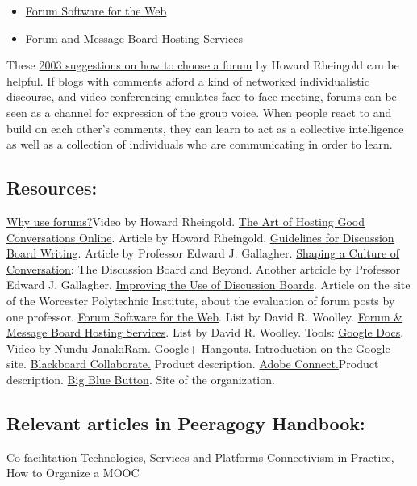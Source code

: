 \begin{itemize}
\item
  \href{http://thinkofit.com/webconf/forumsoft.htm}{Forum Software for
  the Web}
\item
  \href{http://thinkofit.com/webconf/hostsites.htm}{Forum and Message
  Board Hosting Services}
\end{itemize}
These
\href{https://docs.google.com/document/d/1D606u7SfVD3p7xH0lbf2mOO1hIdX97r7kVe753hSYeE/edit}{2003
suggestions on how to choose a forum} by Howard Rheingold can be
helpful. If blogs with comments afford a kind of networked
individualistic discourse, and video conferencing emulates face-to-face
meeting, forums can be seen as a channel for expression of the group
voice. When people react to and build on each other's comments, they can
learn to act as a collective intelligence as well as a collection of
individuals who are communicating in order to learn.

\subsection{Resources:}

\href{http://blip.tv/file/1123048}{Why use forums?}Video by Howard
Rheingold. \href{http://www.rheingold.com/texts/artonlinehost.html}{The
Art of Hosting Good Conversations Online}. Article by Howard Rheingold.
\href{http://www.lehigh.edu/~indiscus/doc\_guidelines.html}{Guidelines
for Discussion Board Writing}. Article by Professor Edward J. Gallagher.
\href{http://academiccommons.org/commons/essay/shaping-culture-conversation}{Shaping
a Culture of Conversation}: The Discussion Board and Beyond. Another
artcicle by Professor Edward J. Gallagher.
\href{http://www.wpi.edu/Academics/ATC/Collaboratory/Idea/boards.html}{Improving
the Use of Discussion Boards}. Article on the site of the Worcester
Polytechnic Institute, about the evaluation of forum posts by one
professor. \href{http://thinkofit.com/webconf/forumsoft.htm}{Forum
Software for the Web}. List by David R. Woolley.
\href{http://thinkofit.com/webconf/hostsites.htm}{Forum \& Message Board
Hosting Services}. List by David R. Woolley. Tools:
\href{http://youtu.be/VVFbqHhkb-k}{Google Docs}. Video by Nundu
JanakiRam. \href{http://www.google.com/+/learnmore/hangouts/}{Google+
Hangouts}. Introduction on the Google site.
\href{http://www.blackboard.com/Platforms/Collaborate/Products/Blackboard-Collaborate.aspx}{Blackboard
Collaborate.} Product description.
\href{http://www.adobe.com/products/adobeconnect.html}{Adobe
Connect.}Product description. \href{http://www.bigbluebutton.org/}{Big
Blue Button}. Site of the organization.

\subsection{Relevant articles in Peeragogy Handbook:}

\href{http://peeragogy.org/co-facilitation-refactor/}{Co-facilitation}
\href{http://peeragogy.org/resources/technologies/}{Technologies,
Services and Platforms}
\href{http://peeragogy.org/organizing-a-learning-context/connectivism-in-practice-how-to-organize-a-mooc/}{Connectivism
in Practice}, How to Organize a MOOC
